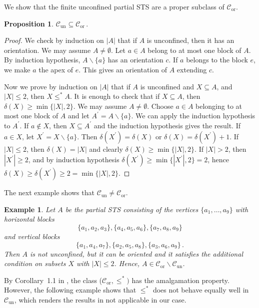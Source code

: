 \documentclass[a4paper, 11pt]{article}
\newcommand{\Cor}{\mathcal{C}_\mathrm{or}}
\newcommand{\Cun}{\mathcal{C}_\mathrm{un}}
\theoremstyle{note}
\newtheorem{prop}[thm]{Proposition}
\newtheorem{ex}[thm]{Example}
\begin{document}
We show that the finite unconfined partial STS are a proper subclass of  $\Cor$. 
\begin{prop} $\Cun\subseteq \Cor \, .$
\end{prop}
\begin{proof}  We check by induction on $|A|$ that if $A$ is unconfined, then it has an orientation.  We may assume $A\neq \emptyset$. Let $a\in A$ belong to at most one block of $A$. By induction hypothesis, $A\smallsetminus \{a\}$ has an orientation $c$. If $a$ belongs to the block $e$, we make $a$ the apex of $e$. This gives an orientation of $A$ extending $c$.

Now we prove by induction on  $|A|$ that if $A$ is unconfined and  $X\subseteq A$, and $|X|\leq 2$, then $X\leq^* A$.  It is enough to check that if $X\subseteq A$, then $\delta(X)\geq \min\{ |X|,2\}$.  We may assume $A\neq\emptyset$. Choose $a\in A$ belonging to at most one block of $A$ and let $A^\prime= A\smallsetminus\{a\}$. We can apply the induction hypothesis to $A^\prime$. If $a\not\in X$, then $X\subseteq A^\prime$ and the induction hypothesis gives the result. If $a\in X$, let  $X^\prime =X\smallsetminus\{a\}$. Then  $\delta(X^\prime)=\delta(X)$ or  $\delta(X)=\delta(X^\prime)+1$.  If $|X|\leq 2$, then $\delta(X)=|X|$ and clearly $\delta(X)\geq \min\{|X|,2\}$.  If $|X|>2$, then %
$|X^\prime| \geq 2$, and by induction hypothesis $\delta(X^\prime) \geq \min \{|X^\prime|,2 \}=2 $, hence $\delta(X) \geq  \delta(X^\prime) \geq 2= \min \{|X|, 2 \} $.
\end{proof}
 The next example shows that $\Cun\neq \Cor$.
\begin{ex}  Let $A$ be the partial STS consisting of the vertices  $\{a_1,\ldots,a_9\}$  with horizontal  blocks  
\[ \{a_1,a_2,a_3\},\{a_4,a_5,a_6\},\{a_7,a_8,a_9\} \]
 and  vertical blocks 
 \[\{a_1,a_4,a_7\},\{a_2,a_5,a_8\},\{a_3,a_6,a_9\} \,. \]
 Then $A$ is not unconfined, but it can be oriented and it satisfies the additional condition on subsets $X$ with $|X|\leq 2$. Hence, $A\in\Cor\smallsetminus \Cun$.
\end{ex}


By Corollary~1.1 in \cite{evans}, the class ($\Cor, \leq^*)$ has the amalgamation property. However, the following example shows that $\leq^*$ does not behave equally well in $\Cun$, which renders the results in \cite{evans} not applicable in our case.
\end{document}
